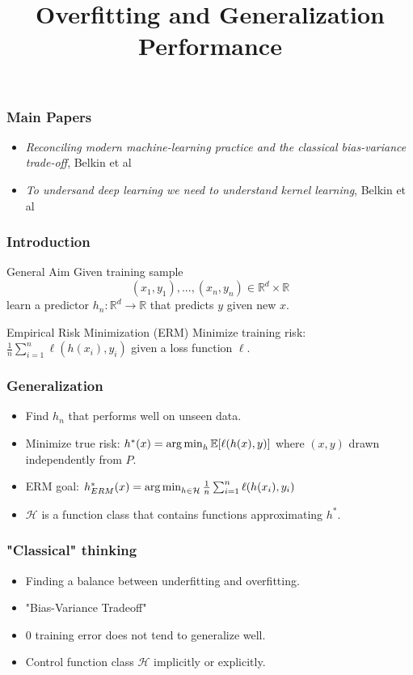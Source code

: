 \documentclass{beamer}
\title[Introductory Talk] %
{Overfitting and Generalization Performance}
\begin{document}
	
\frame{\titlepage}

\begin{frame}
\frametitle{Main Papers}
\begin{itemize}
	\item \textit{Reconciling modern machine-learning practice and the classical bias-variance trade-off}, Belkin et al
	\item \textit{To undersand deep learning we need to understand kernel learning}, Belkin et al
\end{itemize}
\end{frame}

\begin{frame}
\frametitle{Introduction}
	
	\begin{block}{General Aim}
		Given training sample \[(x_1, y_1), ..., (x_n, y_n) \in \mathbb{R}^d \times \mathbb{R}\]
		learn a predictor 
		$h_n : \mathbb{R}^d \to \mathbb{R}$ that predicts $y$ given new $x$.
	\end{block}
	
	\begin{block}{Empirical Risk Minimization (ERM)}
		Minimize training risk:
		$\frac{1}{n} \sum_{i=1}^{n}\ell(h(x_i), y_i) $
		given a loss function $\ell$.
	\end{block}

\end{frame}
\begin{frame}
\frametitle{Generalization}

\begin{itemize}[itemsep = 12pt]
	\item Find $h_n$ that performs well on unseen data.
	\item Minimize true risk: $h^*(x) = \operatorname*{arg\,min}_h \mathbb{E}[\ell (h(x), y)]$ where  $(x, y)$ drawn independently from $P$.
	\item ERM goal: $h^*_{ERM}(x) = \operatorname*{arg\,min}_{h \in \mathcal{H}} \frac{1}{n} \sum_{i=1}^{n}\ell(h(x_i), y_i) $
	\item $\mathcal{H}$ is a function class that contains functions approximating $h^*$.
\end{itemize}

\end{frame}

\begin{frame}
\frametitle{"Classical" thinking}
\begin{itemize}[itemsep = 12pt]
	\item Finding a balance between underfitting and overfitting.
	\item "Bias-Variance Tradeoff"
	\item 0 training error does not tend to generalize well.
	\item Control function class $\mathcal{H}$ implicitly or explicitly.
\end{itemize}
\end{frame}
\end{document}
